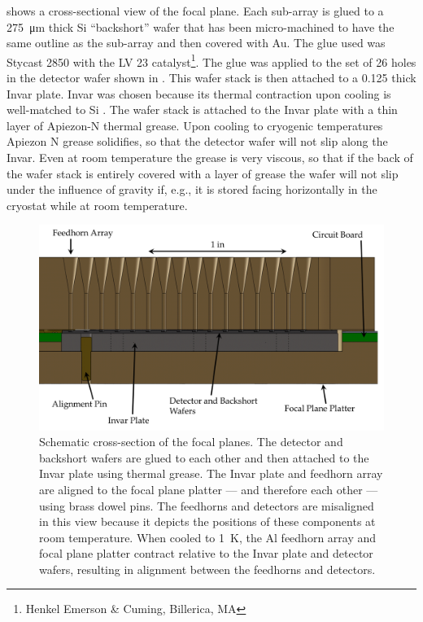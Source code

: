 shows a cross-sectional view of the focal plane.
Each sub-array is glued to a \SI{275}{\um} thick Si ``backshort'' wafer that has been micro-machined to have the same outline as the sub-array and then covered with Au.
The glue used was Stycast 2850 with the LV 23 catalyst\footnote{Henkel Emerson \& Cuming, Billerica, MA}.
The glue was applied to the set of 26 holes in the detector wafer shown in .
This wafer stack is then attached to a \SI{0.125}{\in} thick Invar plate.
Invar was chosen because its thermal contraction upon cooling is well-matched to Si \cite{ekin_experimental_2006}.
The wafer stack is attached to the Invar plate with a thin layer of Apiezon-N thermal grease.
Upon cooling to cryogenic temperatures Apiezon N grease solidifies, so that the detector wafer will not slip along the Invar.
Even at room temperature the grease is very viscous, so that if the back of the wafer stack is entirely covered with a layer of grease the wafer will not slip under the influence of gravity if, e.g., it is stored facing horizontally in the cryostat while at room temperature.
\begin{figure}

\centering
\includegraphics[width=\textwidth]{images/ch5-focal-cross-labled.png}
\caption[Focal plane cross-section]{
  Schematic cross-section of the focal planes.
  The detector and backshort wafers are glued to each other and then attached to the Invar plate using thermal grease.
  The Invar plate and feedhorn array are aligned to the focal plane platter --- and therefore each other --- using brass dowel pins.
  The feedhorns and detectors are misaligned in this view because it depicts the positions of these components at room temperature.
  When cooled to \SI{1}{\K}, the Al feedhorn array and focal plane platter contract relative to the Invar plate and detector wafers, resulting in alignment between the feedhorns and detectors.
}
\label{fig:ch5-focal-cross}
\end{figure}

